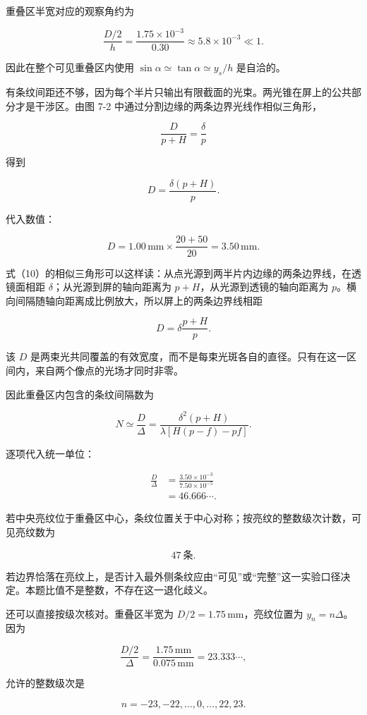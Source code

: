 \documentclass[12pt,a4paper,UTF8]{ctexart}
\begin{document}
重叠区半宽对应的观察角约为

\[
\frac{D/2}{h}
=\frac{1.75\times10^{-3}}{0.30}
\approx5.8\times10^{-3}\ll1.
\]

因此在整个可见重叠区内使用 \(\sin\alpha\simeq\tan\alpha\simeq y_s/h\)
是自洽的。

有条纹间距还不够，因为每个半片只输出有限截面的光束。两光锥在屏上的公共部分才是干涉区。由图
7-2 中通过分割边缘的两条边界光线作相似三角形，

\[
\frac{D}{p+H}=\frac{\delta}{p}
\tag{10}
\]

得到

\[
D=\frac{\delta(p+H)}p.
\tag{11}
\]

代入数值：

\[
D=1.00\,\mathrm{mm}\times\frac{20+50}{20}
=3.50\,\mathrm{mm}.
\tag{12}
\]

式（10）的相似三角形可以这样读：从点光源到两半片内边缘的两条边界线，在透镜面相距
\(\delta\)；从光源到屏的轴向距离为 \(p+H\)，从光源到透镜的轴向距离为
\(p\)。横向间隔随轴向距离成比例放大，所以屏上的两条边界线相距

\[
D=\delta\frac{p+H}{p}.
\]

该 \(D\)
是两束光共同覆盖的有效宽度，而不是每束光斑各自的直径。只有在这一区间内，来自两个像点的光场才同时非零。

因此重叠区内包含的条纹间隔数为

\[
N\simeq\frac D\Delta
=\frac{\delta^2(p+H)}
{\lambda[H(p-f)-pf]}.
\tag{13}
\]

逐项代入统一单位：

\[
\begin{aligned}
\frac D\Delta
&=\frac{3.50\times10^{-3}}
{7.50\times10^{-5}}\\
&=46.666\cdots.
\end{aligned}
\tag{14}
\]

若中央亮纹位于重叠区中心，条纹位置关于中心对称；按亮纹的整数级次计数，可见亮纹数为

\[
\boxed{47\ \text{条}}.
\tag{15}
\]

若边界恰落在亮纹上，是否计入最外侧条纹应由``可见''或``完整''这一实验口径决定。本题比值不是整数，不存在这一退化歧义。

还可以直接按级次核对。重叠区半宽为 \(D/2=1.75\,\mathrm{mm}\)，亮纹位置为
\(y_n=n\Delta\)。因为

\[
\frac{D/2}{\Delta}
=\frac{1.75\,\mathrm{mm}}{0.075\,\mathrm{mm}}
=23.333\cdots,
\]

允许的整数级次是

\[
n=-23,-22,\ldots,0,\ldots,22,23.
\]
\end{document}
